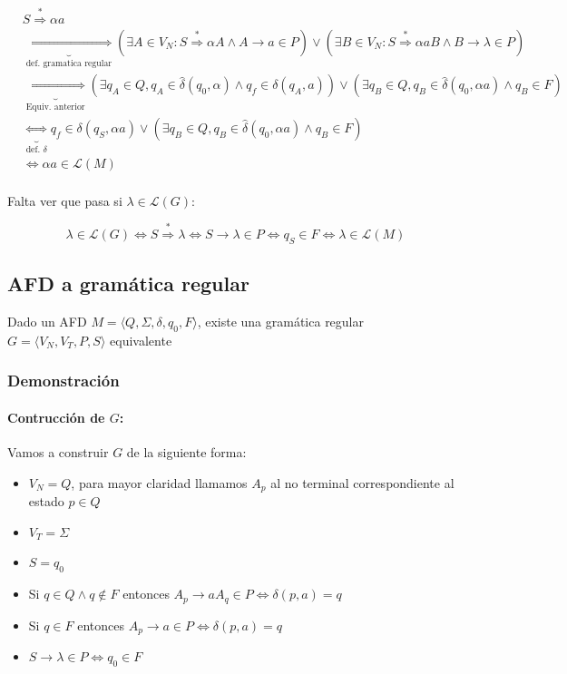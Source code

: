 \begin{align*}
   & S\overset{*}{\Rightarrow} \alpha a                                                                                                                                                                                                    \\
   & \underbrace{\iff}_{\text{def. gramatica regular}} (\exists A\in V_N: S \overset{*}{\Rightarrow} \alpha A \wedge A \rightarrow a \in P)\lor(\exists B\in V_N: S \overset{*}{\Rightarrow} \alpha aB \wedge B \rightarrow \lambda \in P) \\
   & \underbrace{\iff}_{\text{Equiv. anterior}} (\exists q_A\in Q, q_A\in\hat\delta(q_0, \alpha) \land q_f\in\delta(q_A, a)) \lor (\exists q_B\in Q, q_B\in\hat\delta(q_0, \alpha a) \land q_B\in F)                                       \\
   & \underbrace{\iff}_{\text{def. }\delta} q_f\in\delta(q_S, \alpha a) \lor (\exists q_B\in Q, q_B\in\hat\delta(q_0, \alpha a) \land q_B\in F)                                                                                            \\
   & \iff \alpha a \in \mathcal{L}(M)                                                                                                                                                                                                      \\
\end{align*}

Falta ver que pasa si \(\lambda\in\mathcal{L}(G)\):

\[ \lambda\in\mathcal{L}(G) \iff S\overset{*}{\Rightarrow} \lambda \iff S\rightarrow \lambda \in P \iff q_S\in F \iff \lambda \in \mathcal{L}(M)\]
\subsection{AFD a gramática regular}
Dado un AFD \(M=\langle Q, \Sigma, \delta, q_0, F\rangle\), existe una gramática regular \(G=\langle V_N, V_T, P, S\rangle\) equivalente

\subsubsection{Demonstración}
\paragraph{Contrucción de \(G\):} Vamos a construir \(G\) de la siguiente forma:
\begin{itemize}
  \item \(V_N = Q\), para mayor claridad llamamos \(A_p\) al no terminal correspondiente al estado \(p\in Q\)
  \item \(V_T = \Sigma\)
  \item \(S = q_0\)
  \item Si \(q\in Q \land q\notin F\) entonces \(A_p \rightarrow aA_q \in P \iff \delta(p,a) = q\)
  \item Si \(q\in F\) entonces \(A_p \rightarrow a \in P \iff \delta(p,a) = q\)
  \item \(S\rightarrow \lambda \in P \iff q_0\in F\)
\end{itemize}

